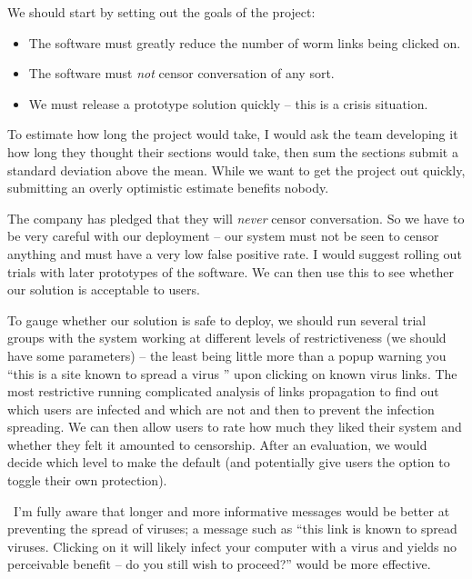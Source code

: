 \documentclass[10pt,\jkfside,a4paper]{article}
\begin{document}
\begin{enumerate}
\begin{enumerate}[label=(\alph*)]
We should start by setting out the goals of the project:

\begin{itemize}

\item The software must greatly reduce the number of worm links being clicked on.

\item The software must \textit{not} censor conversation of any sort.

\item We must release a prototype solution quickly -- this is a crisis situation.

\end{itemize}

To estimate how long the project would take, I would ask the team developing it how long they
thought their sections would take, then sum the sections submit a standard deviation above the mean. While we
want to get the project out quickly, submitting an overly optimistic estimate benefits nobody.

The company has pledged that they will \textit{never} censor conversation.
So we have to be very careful with our deployment -- our system must not be seen
to censor anything and must have a very low false positive rate. I would suggest
rolling out trials with later prototypes of the software. We can then use this to see whether
our solution is acceptable to users.

To gauge whether our solution is safe to deploy, we should run several trial groups
with the system working at different levels of restrictiveness (we should have some parameters)
-- the least being little more than a popup warning you ``this is a site known to spread a virus \dag''
upon clicking on known virus links. The most restrictive running complicated analysis of
links propagation to find out which users are infected and which are not and then to
prevent the infection spreading. We can then allow users to rate how much they liked their system and
whether they felt it amounted to censorship. After an evaluation, we would decide which level to make the default (and
potentially give users the option to toggle their own protection).

\dag \ I'm fully aware that longer and more informative messages would be better at preventing the spread of viruses;
a message such as ``this link is known to spread viruses. Clicking on it will likely infect your computer with a
virus and yields no perceivable benefit -- do you still wish to proceed?'' would be more effective.


\end{enumerate}
\end{enumerate}
\end{document}
